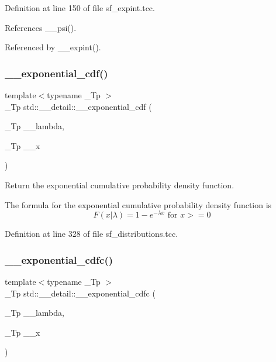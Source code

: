Definition at line 150 of file sf\+\_\+expint.\+tcc.



References \+\_\+\+\_\+psi().



Referenced by \+\_\+\+\_\+expint().

\mbox{\label{namespacestd_1_1____detail_ada7f806f891a02d7825ec9a8862302ad}} 
\subsubsection{\texorpdfstring{\+\_\+\+\_\+exponential\+\_\+cdf()}{\_\_exponential\_cdf()}}
{\footnotesize\ttfamily template$<$typename \+\_\+\+Tp $>$ \\
\+\_\+\+Tp std\+::\+\_\+\+\_\+detail\+::\+\_\+\+\_\+exponential\+\_\+cdf (\begin{DoxyParamCaption}\item[{\+\_\+\+Tp}]{\+\_\+\+\_\+lambda,  }\item[{\+\_\+\+Tp}]{\+\_\+\+\_\+x }\end{DoxyParamCaption})}



Return the exponential cumulative probability density function. 

The formula for the exponential cumulative probability density function is \[ F(x|\lambda) = 1 - e^{-\lambda x} \mbox{ for } x >= 0 \] 

Definition at line 328 of file sf\+\_\+distributions.\+tcc.

\mbox{\label{namespacestd_1_1____detail_a4e72483dfbfe8c866974d89f9aeb4b28}} 
\subsubsection{\texorpdfstring{\+\_\+\+\_\+exponential\+\_\+cdfc()}{\_\_exponential\_cdfc()}}
{\footnotesize\ttfamily template$<$typename \+\_\+\+Tp $>$ \\
\+\_\+\+Tp std\+::\+\_\+\+\_\+detail\+::\+\_\+\+\_\+exponential\+\_\+cdfc (\begin{DoxyParamCaption}\item[{\+\_\+\+Tp}]{\+\_\+\+\_\+lambda,  }\item[{\+\_\+\+Tp}]{\+\_\+\+\_\+x }\end{DoxyParamCaption})}



